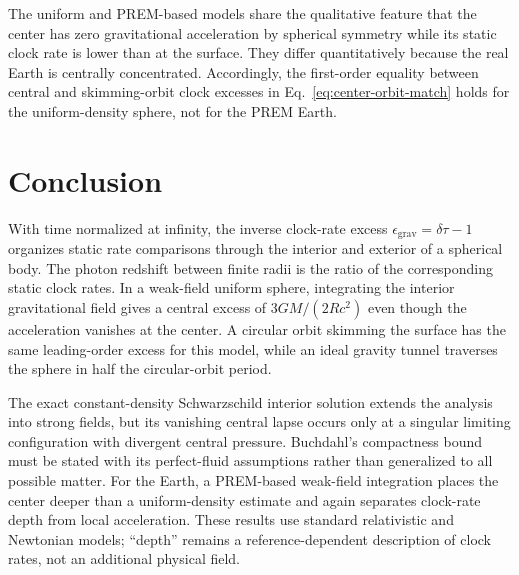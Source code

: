 \documentclass[12pt]{article}
\begin{document}
The uniform and PREM-based models share the qualitative feature that the center has zero gravitational acceleration by spherical symmetry while its static clock rate is lower than at the surface. They differ quantitatively because the real Earth is centrally concentrated. Accordingly, the first-order equality between central and skimming-orbit clock excesses in Eq.~\eqref{eq:center-orbit-match} holds for the uniform-density sphere, not for the PREM Earth.

\section{Conclusion}

With time normalized at infinity, the inverse clock-rate excess $\epsilon_{\mathrm{grav}}=\delta\tau-1$ organizes static rate comparisons through the interior and exterior of a spherical body. The photon redshift between finite radii is the ratio of the corresponding static clock rates. In a weak-field uniform sphere, integrating the interior gravitational field gives a central excess of $3GM/(2Rc^2)$ even though the acceleration vanishes at the center. A circular orbit skimming the surface has the same leading-order excess for this model, while an ideal gravity tunnel traverses the sphere in half the circular-orbit period.

The exact constant-density Schwarzschild interior solution extends the analysis into strong fields, but its vanishing central lapse occurs only at a singular limiting configuration with divergent central pressure. Buchdahl's compactness bound must be stated with its perfect-fluid assumptions rather than generalized to all possible matter. For the Earth, a PREM-based weak-field integration places the center deeper than a uniform-density estimate and again separates clock-rate depth from local acceleration. These results use standard relativistic and Newtonian models; ``depth'' remains a reference-dependent description of clock rates, not an additional physical field.
\end{document}
